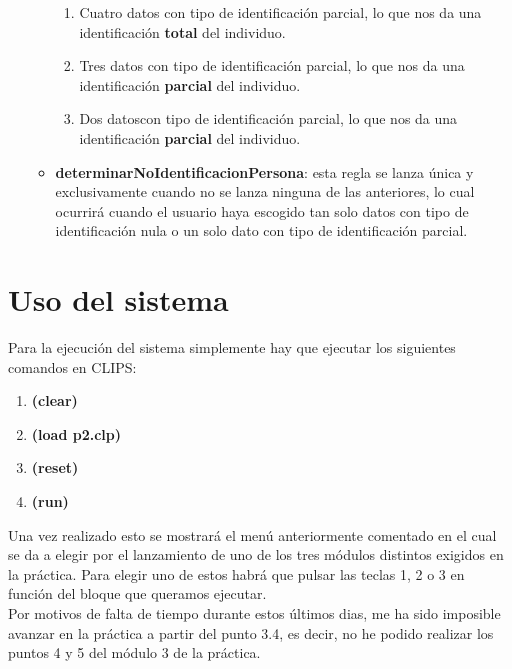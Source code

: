 \begin{itemize}
\begin{itemize}
\begin{enumerate}
				\item Cuatro datos con tipo de identificación parcial, lo que nos da una identificación \textbf{total} del individuo.
				\item Tres datos con tipo de identificación parcial, lo que nos da una identificación \textbf{parcial} del individuo.
				\item Dos datoscon tipo de identificación parcial, lo que nos da una identificación \textbf{parcial} del individuo.
			\end{enumerate}
			\item \textbf{determinarNoIdentificacionPersona}: esta regla se lanza única y exclusivamente cuando no se lanza ninguna de las anteriores, lo cual ocurrirá cuando el usuario haya escogido tan solo datos con tipo de identificación nula o un solo dato con tipo de identificación parcial.
		\end{itemize}
\end{itemize}


\section{Uso del sistema}

Para la ejecución del sistema simplemente hay que ejecutar los siguientes comandos en CLIPS: 

\begin{enumerate}
	\item \textbf{(clear)}
	\item \textbf{(load p2.clp)}
	\item \textbf{(reset)}
	\item \textbf{(run)}
\end{enumerate}

Una vez realizado esto se mostrará el menú anteriormente comentado en el cual se da a elegir por el lanzamiento de uno de los tres módulos distintos exigidos en la práctica. Para elegir uno de estos habrá que pulsar las teclas 1, 2 o 3 en función del bloque que queramos ejecutar.\\

Por motivos de falta de tiempo durante estos últimos dias, me ha sido imposible avanzar en la práctica a partir del punto 3.4, es decir, no he podido realizar los puntos 4 y 5 del módulo 3 de la práctica.























